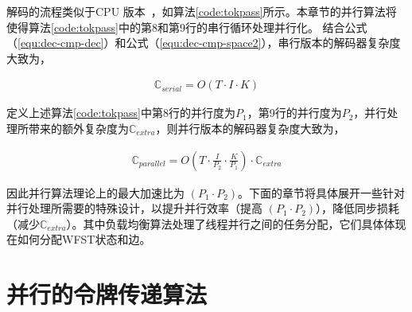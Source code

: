 解码的流程类似于CPU 版本~\cite{povey2011kaldi}，如算法\ref{code:tokpass}所示。本章节的并行算法将使得算法\ref{code:tokpass}中的第8和第9行的串行循环处理并行化。
结合公式（\ref{equ:dec-cmp-dec}）和公式（\ref{equ:dec-cmp-space2}），串行版本的解码器复杂度大致为，

\begin{equation}
\label{equ:dec-cmp-serial}
 \begin{split}
\mathbb{C}_{serial} = O(T\cdot I \cdot K)
 \end{split}
\end{equation}

定义上述算法\ref{code:tokpass}中第8行的并行度为$P_1$，第9行的并行度为$P_2$，并行处理所带来的额外复杂度为$\mathbb{C}_{extra} $，则并行版本的解码器复杂度大致为，

\begin{equation}
\label{equ:dec-cmp-parallel}
 \begin{split}
\mathbb{C}_{parallel} = O(T\cdot \frac{I}{P_2} \cdot \frac{K}{P_1})\cdot \mathbb{C}_{extra}
 \end{split}
\end{equation}

因此并行算法理论上的最大加速比为 $(P_1 \cdot P_2)$。下面的章节将具体展开一些针对并行处理所需要的特殊设计，以提升并行效率（提高 $(P_1 \cdot P_2)$），降低同步损耗（减少$\mathbb{C}_{extra}$）。其中负载均衡算法处理了线程并行之间的任务分配，它们具体体现在如何分配WFST状态和边。

\section{并行的令牌传递算法}
\label{sec:atomic}


